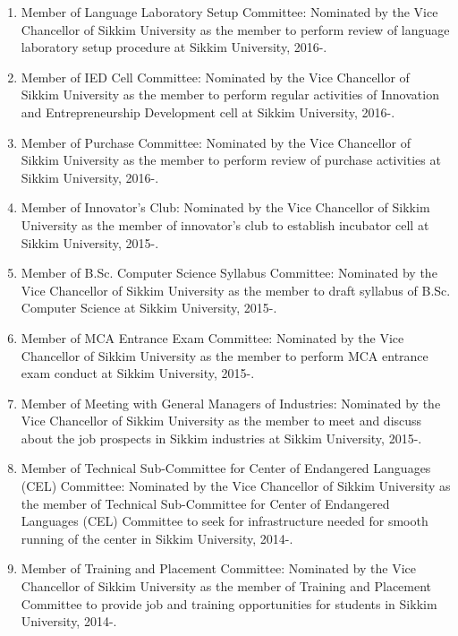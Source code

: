 \documentclass[11pt,a4paper]{moderncv}
\begin{document}
\begin{adjustwidth}{6em}{0pt}
\begin{enumerate}
		\item Member of Language Laboratory Setup Committee: Nominated by the Vice Chancellor of Sikkim University as the member to perform review of language laboratory setup procedure at Sikkim University, 2016-.
		
		\item Member of IED Cell Committee: Nominated by the Vice Chancellor of Sikkim University as the member to perform regular activities of Innovation and Entrepreneurship Development cell at Sikkim University, 2016-.
		
		\item Member of Purchase Committee: Nominated by the Vice Chancellor of Sikkim University as the member to perform review of purchase activities at Sikkim University, 2016-.
		
		\item Member of Innovator's Club: Nominated by the Vice Chancellor of Sikkim University as the member of innovator's club to establish incubator cell at Sikkim University, 2015-.
		
		\item Member of B.Sc. Computer Science Syllabus Committee: Nominated by the Vice Chancellor of Sikkim University as the member to draft syllabus of B.Sc. Computer Science at Sikkim University, 2015-.
		
		\item Member of MCA Entrance Exam Committee: Nominated by the Vice Chancellor of Sikkim University as the member to perform MCA entrance exam conduct at Sikkim University, 2015-.
		
		\item Member of Meeting with General Managers of Industries: Nominated by the Vice Chancellor of Sikkim University as the member to meet and discuss about the job prospects in Sikkim industries at Sikkim University, 2015-.
		
		\item Member of Technical Sub-Committee for Center of Endangered Languages (CEL) Committee: Nominated by the Vice Chancellor of Sikkim University as the member of Technical Sub-Committee for Center of Endangered Languages (CEL) Committee to seek for infrastructure needed for smooth running of the center in Sikkim University, 2014-.
		
		\item Member of Training and Placement Committee: Nominated by the Vice Chancellor of Sikkim University as the member of Training and Placement Committee to provide job and training opportunities for students in Sikkim University, 2014-.
		

\end{enumerate}
\end{adjustwidth}
\end{document}
